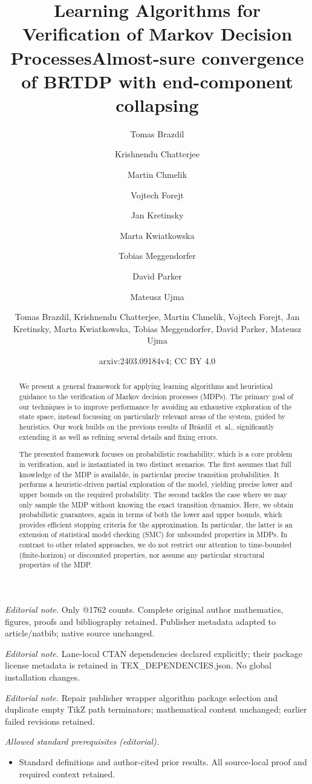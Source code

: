 \documentclass{article}
\title{Learning Algorithms for Verification of Markov Decision Processes}
\author{Tomas Brazdil \and Krishnendu Chatterjee \and Martin Chmelik \and Vojtech Forejt \and Jan Kretinsky \and Marta Kwiatkowska \and Tobias Meggendorfer \and David Parker \and Mateusz Ujma}\date{}
\title{Almost-sure convergence of BRTDP with end-component collapsing}
\author{Tomas Brazdil, Krishnendu Chatterjee, Martin Chmelik, Vojtech Forejt, Jan Kretinsky, Marta Kwiatkowska, Tobias Meggendorfer, David Parker, Mateusz Ujma}
\date{arxiv:2403.09184v4; CC BY 4.0}
\begin{document}
\maketitle
\noindent\textit{Editorial note.} Only @1762 counts. Complete original author mathematics, figures, proofs and bibliography retained. Publisher metadata adapted to article/natbib; native source unchanged.\par\medskip
\noindent\textit{Editorial note.} Lane-local CTAN dependencies declared explicitly; their package license metadata is retained in TEX\_DEPENDENCIES.json. No global installation changes.\par\medskip
\noindent\textit{Editorial note.} Repair publisher wrapper algorithm package selection and duplicate empty TikZ path terminators; mathematical content unchanged; earlier failed revisions retained.\par\medskip
\noindent\textit{Allowed standard prerequisites (editorial).}\begin{itemize}
\item Standard definitions and author-cited prior results. All source-local proof and required context retained.
\end{itemize}\medskip
	\maketitle
	
	\begin{abstract}
		We present a general framework for applying learning algorithms and heuristical guidance to the verification of Markov decision processes (MDPs).
The primary goal of our techniques is to improve performance by avoiding an exhaustive exploration of the state space, instead focussing on particularly relevant areas of the system, guided by heuristics.
Our work builds on the previous results of Br{\'{a}}zdil~et~al., significantly extending it as well as refining several details and fixing errors.

The presented framework focuses on probabilistic reachability, which is a core problem in verification, and is instantiated in two distinct scenarios.
The first assumes that full knowledge of the MDP is available, in particular precise transition probabilities.
It performs a heuristic-driven partial exploration of the model, yielding precise lower and upper bounds on the required probability.
The second tackles the case where we may only sample the MDP without knowing the exact transition dynamics.
Here, we obtain probabilistic guarantees, again in terms of both the lower and upper bounds, which provides efficient stopping criteria for the approximation.
In particular, the latter is an extension of statistical model checking (SMC) for unbounded properties in MDPs.
In contrast to other related approaches, we do not restrict our attention to time-bounded (finite-horizon) or discounted properties, nor assume any particular structural properties of the MDP.
	\end{abstract}
\end{document}
